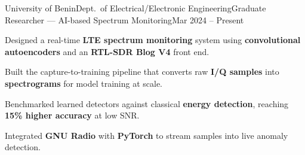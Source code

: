 \begin{cvjob}{University of Benin}{Dept.\ of Electrical/Electronic Engineering}{Graduate Researcher --- AI-based Spectrum Monitoring}{Mar 2024 -- Present}
  \item Designed a real-time \textbf{LTE spectrum monitoring} system using \textbf{convolutional autoencoders} and an \textbf{RTL-SDR Blog V4} front end.
  \item Built the capture-to-training pipeline that converts raw \textbf{I/Q samples} into \textbf{spectrograms} for model training at scale.
  \item Benchmarked learned detectors against classical \textbf{energy detection}, reaching \textbf{15\% higher accuracy} at low SNR.
  \item Integrated \textbf{GNU Radio} with \textbf{PyTorch} to stream samples into live anomaly detection.
\end{cvjob}
